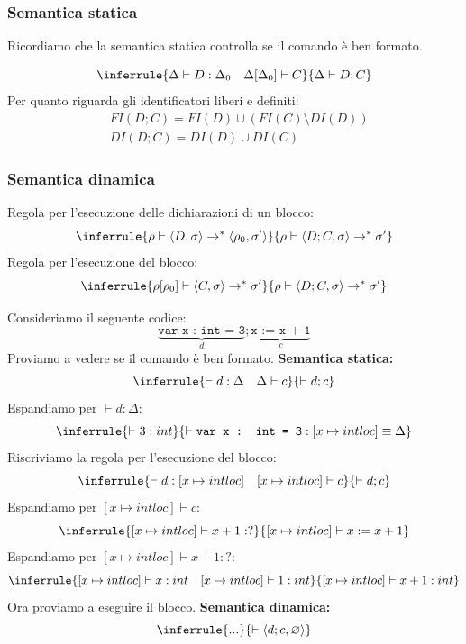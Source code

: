 \documentclass[a4paper]{article}
\begin{document}
\subsubsection{Semantica statica}

Ricordiamo che la semantica statica controlla se il comando è ben formato. 

\[
\inferrule{
  \Delta \vdash D : \Delta_0 \quad \Delta[\Delta_0] \vdash C
}
{
  \Delta \vdash D ; C
}
\]
Per quanto riguarda gli identificatori liberi e definiti:
\[
\begin{aligned}
  &FI(D ; C) = FI(D) \cup (FI(C) \setminus DI(D))\\
  &DI(D ; C) = DI(D) \cup DI(C)
\end{aligned}
\]

\subsubsection{Semantica dinamica}

Regola per l'esecuzione delle dichiarazioni di un blocco: 
\[
\inferrule{
  \rho \vdash \left<D, \sigma\right> \to^* \left<\rho_0, \sigma'\right> 
}
{
  \rho \vdash \left<D ; C, \sigma\right> \to^* \sigma'
}
\]
Regola per l'esecuzione del blocco:
\[
\inferrule{
  \rho[\rho_0] \vdash \left<C, \sigma\right> \to^* \sigma'
}
{
  \rho \vdash \left<D ; C, \sigma\right> \to^* \sigma'
}
\]
\begin{Example}{}{}
Consideriamo il seguente codice:
\[
  \underbrace{\texttt{var x : int = 3}}_{d}; \underbrace{\texttt{x := x + 1}}_{c}
\]
Proviamo a vedere se il comando è ben formato. \textbf{Semantica statica:}
\[
  \inferrule
  {\vdash d : \Delta \quad \Delta \vdash c}
  {\vdash d ; c}
\]
Espandiamo per $\vdash d : \Delta$:
\[
  \inferrule
  {\vdash 3 : int}
  {\vdash \texttt{var x : int = 3} : [x \mapsto intloc] \equiv \Delta}
\]
Riscriviamo la regola per l'esecuzione del blocco:
\[
  \inferrule
  {\vdash d: [x \mapsto intloc] \quad [x \mapsto intloc] \vdash c}
  {\vdash d ; c}
\]
Espandiamo per $[x \mapsto intloc] \vdash c$:
\[
  \inferrule
  {[x \mapsto intloc] \vdash x + 1 : ?}
  {[x \mapsto intloc] \vdash x := x + 1}
\]
Espandiamo per $[x \mapsto intloc] \vdash x + 1 : ?$:
\[
  \inferrule
  {[x \mapsto intloc] \vdash x : int \quad [x \mapsto intloc] \vdash 1 : int}
  {[x \mapsto intloc] \vdash x + 1 : int}
\]
Ora proviamo a eseguire il blocco. \textbf{Semantica dinamica:}
\[
  \inferrule
  {...}
  {\vdash \left<d ; c, \varnothing\right>}
\]

\end{Example}
\end{document}
